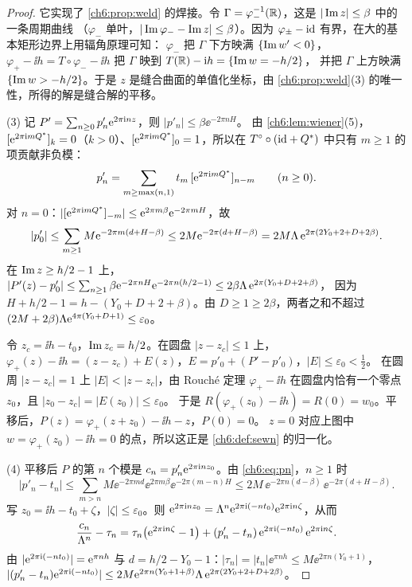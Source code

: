 \begin{proof}
它实现了 \cref{ch6:prop:weld} 的焊接。令 $\Gamma=\varphi_-^{-1}(\mathbb{R})$，这是 $|\operatorname{Im} z|\le\beta$ 中的一条周期曲线
（$\varphi_-$ 单叶，$|\operatorname{Im}\varphi_--\operatorname{Im} z|\le\beta$）。因为 $\varphi_\pm-\mathrm{id}$ 有界，在大的基本矩形边界上用辐角原理可知：
$\varphi_-$ 把 $\Gamma$ 下方映满 $\{\operatorname{Im} w'<0\}$，$\varphi_+-\ii h=T\circ\varphi_--\ii h$ 把 $\Gamma$ 映到 $T(\mathbb{R})-\mathrm{i} h=\{\operatorname{Im} w=-h/2\}$，
并把 $\Gamma$ 上方映满 $\{\operatorname{Im} w>-h/2\}$。于是 $z$ 是缝合曲面的单值化坐标，由 \cref{ch6:prop:weld}(3) 的唯一性，所得的解是缝合解的平移。

(3) 记 $P'=\sum_{n\ge0}p'_n\mathrm{e}^{2\pi\mathrm{i} nz}$，则 $|p'_n|\le\beta\ee^{-2\pi nH}$。
由 \cref{ch6:lem:wiener}(5)，$[\mathrm{e}^{2\pi\mathrm{i} mQ^*}]_k=0$（$k>0$）、$[\mathrm{e}^{2\pi\mathrm{i} mQ^*}]_0=1$，所以在 $T^{\circ}\circ(\mathrm{id}+Q^*)$ 中只有 $m\ge1$ 的项贡献非负模：
\begin{equation}\label{ch6:eq:pn}
 p'_n=\sum_{m\ge\max(n,1)}t_m\,[\mathrm{e}^{2\pi\mathrm{i} mQ^*}]_{n-m}\qquad(n\ge0).
\end{equation}
对 $n=0$：$|[\mathrm{e}^{2\pi\mathrm{i} mQ^*}]_{-m}|\le\mathrm{e}^{2\pi m\beta}\mathrm{e}^{-2\pi mH}$，故
\[
 |p'_0|\le\sum_{m\ge1}M\mathrm{e}^{-2\pi m(d+H-\beta)}\le2M\mathrm{e}^{-2\pi(d+H-\beta)}=2M\Lambda\,\mathrm{e}^{2\pi(2Y_0+2+D+2\beta)}.
\]
在 $\operatorname{Im} z\ge h/2-1$ 上，$|P'(z)-p'_0|\le\sum_{n\ge1}\beta\mathrm{e}^{-2\pi nH}\mathrm{e}^{-2\pi n(h/2-1)}\le2\beta\Lambda\,\mathrm{e}^{2\pi(Y_0+D+2+\beta)}$，
因为 $H+h/2-1=h-(Y_0+D+2+\beta)$。由 $D\ge1\ge2\beta$，两者之和不超过 $(2M+2\beta)\Lambda\mathrm{e}^{4\pi(Y_0+D+1)}\le\varepsilon_0$。

令 $z_c=\ii h-t_0$，$\operatorname{Im} z_c=h/2$。在圆盘 $|z-z_c|\le1$ 上，$\varphi_+(z)-\ii h=(z-z_c)+E(z)$，$E=p'_0+(P'-p'_0)$，$|E|\le\varepsilon_0<\tfrac12$。
在圆周 $|z-z_c|=1$ 上 $|E|<|z-z_c|$，由 Rouché 定理 $\varphi_+-\ii h$ 在圆盘内恰有一个零点 $z_0$，且 $|z_0-z_c|=|E(z_0)|\le\varepsilon_0$。
于是 $R(\varphi_+(z_0)-\ii h)=R(0)=w_0$。平移后，$P(z)=\varphi_+(z+z_0)-\ii h-z$，$P(0)=0$。
$z=0$ 对应上图中 $w=\varphi_+(z_0)-\ii h=0$ 的点，所以这正是 \cref{ch6:def:sewn} 的归一化。

(4) 平移后 $P$ 的第 $n$ 个模是 $c_n=p'_n\mathrm{e}^{2\pi\mathrm{i} nz_0}$。由 \eqref{ch6:eq:pn}，$n\ge1$ 时
\[
 |p'_n-t_n|\le\sum_{m>n}M\ee^{-2\pi md}\ee^{2\pi m\beta}\ee^{-2\pi(m-n)H}\le2M\,\ee^{-2\pi n(d-\beta)}\,\ee^{-2\pi(d+H-\beta)} .
\]
写 $z_0=\ii h-t_0+\zeta$，$|\zeta|\le\varepsilon_0$。则 $\mathrm{e}^{2\pi\mathrm{i} nz_0}=\Lambda^n\mathrm{e}^{2\pi\mathrm{i} (-nt_0)}\mathrm{e}^{2\pi\mathrm{i} n\zeta}$，从而
\begin{equation}\label{ch6:eq:chat-split}
 \frac{c_n}{\Lambda^n}-\tau_n=\tau_n\bigl(\mathrm{e}^{2\pi\mathrm{i} n\zeta}-1\bigr)+(p'_n-t_n)\,\mathrm{e}^{2\pi\mathrm{i} (-nt_0)}\,\mathrm{e}^{2\pi\mathrm{i} n\zeta}.
\end{equation}
由 $|\mathrm{e}^{2\pi\mathrm{i} (-nt_0)}|=\mathrm{e}^{\pi nh}$ 与 $d=h/2-Y_0-1$：$|\tau_n|=|t_n|\ee^{\pi nh}\le M\ee^{2\pi n(Y_0+1)}$，
$|(p'_n-t_n)\mathrm{e}^{2\pi\mathrm{i} (-nt_0)}|\le2M\mathrm{e}^{2\pi n(Y_0+1+\beta)}\Lambda\,\mathrm{e}^{2\pi(2Y_0+2+D+2\beta)}$。


\end{proof}
